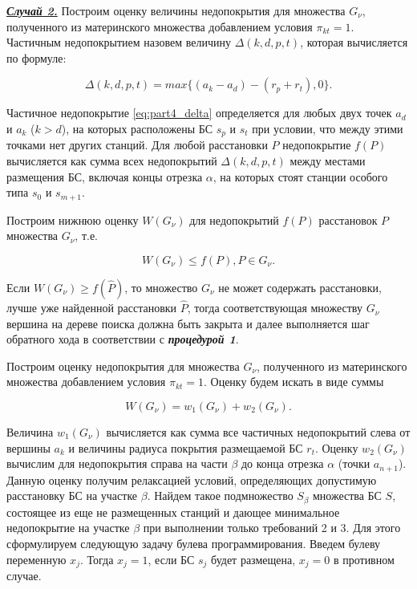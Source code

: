 \underline{\textit{\textbf{Случай 2.}}}
Построим оценку величины недопокрытия для множества $G_\nu$, полученного из материнского множества добавлением условия $\pi_{kt}=1$. Частичным недопокрытием назовем величину $\Delta(k,d,p,t)$, которая вычисляется по формуле:

\begin{equation}\label{eq:part4_delta}
\Delta(k,d,p,t) = max\{\left(a_{k} - a_{d} \right) - \left(r_{p} + r_{t} \right), 0\}.
\end{equation}

Частичное недопокрытие \cref{eq:part4_delta} определяется для любых двух точек $a_d$ и $a_k$ ($k>d$), на которых расположены БС $s_p$ и $s_t$ при условии, что между этими точками нет других станций. Для любой расстановки $P$ недопокрытие $f(P)$ вычисляется как сумма всех недопокрытий $\Delta(k,d,p,t)$ между местами размещения БС, включая концы отрезка $\alpha$, на которых стоят станции особого типа $s_0$ и $s_{m+1}$.

Построим нижнюю оценку $W(G_{\nu} )$ для недопокрытий $f(P)$ расстановок $P$ множества $G_\nu$, т.е. 

\begin{displaymath}
W(G_\nu) \leq f(P), P \in G_\nu. 
\end{displaymath}

Если $W(G_\nu) \geq f(\widehat{P})$, то множество $G_\nu$ не может содержать расстановки, лучше уже найденной расстановки $\widehat{P}$, тогда соответствующая множеству $G_\nu$  вершина на дереве поиска должна быть закрыта и далее выполняется шаг обратного хода в соответствии с  \textit{\textbf{процедурой 1}}. 

Построим оценку недопокрытия для множества $G_\nu$, полученного из материнского множества добавлением условия $\pi_{kt}=1$. Оценку будем искать в виде суммы

\begin{equation}\label{eq:part2_noncoverage_estimation}
  W\left(G_\nu\right) = w_1 \left(G_\nu \right) + w_2 \left(G_\nu \right). 
\end{equation}

Величина $w_1 \left(G_\nu \right)$ вычисляется как сумма все частичных недопокрытий слева от вершины $a_k$ и величины радиуса покрытия размещаемой БС $r_t$. Оценку $w_2 \left(G_\nu \right)$ вычислим для недопокрытия справа на части $\beta$ до конца отрезка $\alpha$ (точки $a_{n+1}$). Данную оценку получим релаксацией условий, определяющих допустимую расстановку БС на участке $\beta$. Найдем такое подмножество $S_\beta$ множества БС $S$, состоящее из еще не размещенных станций и дающее минимальное недопокрытие на участке $\beta$ при выполнении только требований 2 и 3. Для этого сформулируем следующую задачу булева программирования. Введем булеву переменную $x_j$. Тогда $x_j = 1$, если БС $s_j$ будет размещена, $x_j = 0$ в противном случае.

